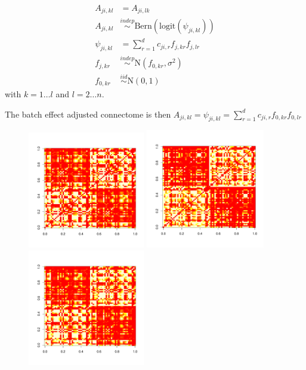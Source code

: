 \documentclass[simplex.tex]{subfiles}
\begin{document}
\begin{equation}
\begin{aligned}
A_{ji, kl} & =  A_{ji, lk}\\
A_{ji, kl} & \stackrel{indep}{\sim} \text{Bern}(\text{logit}(\psi_{ji,kl}))\\
\psi_{ji,kl} & = \sum_{r=1}^{d} c_{ji, r} f_{j,kr} f_{j,lr}   \\
f_{j,kr} & \stackrel{indep}{\sim}  \text{N}(f_{0,kr}, \sigma^2)\\
f_{0,kr} & \stackrel{iid}{\sim} \text{N}(0, 1)
\end{aligned}
\end{equation}
with $k=1\ldots l$ and $l=2\ldots n$.

The batch effect adjusted connectome is then $A_{ji, kl} = \psi_{ji,kl} = \sum_{r=1}^{d} c_{ji, r} f_{0,kr} f_{0,lr} $
\begin{figure}[h!]
\begin{cframed}
\centering
\includegraphics[width=0.455\textwidth, clip = true,  trim = 0mm 15mm 0mm 10mm]{../../figs/avgA1}
\includegraphics[width=0.4635\textwidth, clip = true, trim = 0mm 15mm 0mm 10mm ]{../../figs/avgA3}
\includegraphics[width=0.455\textwidth, clip = true,  trim = 0mm 15mm 0mm 10mm]{../../figs/avgA1adjusted}

\end{cframed}
\end{figure}
\end{document}
